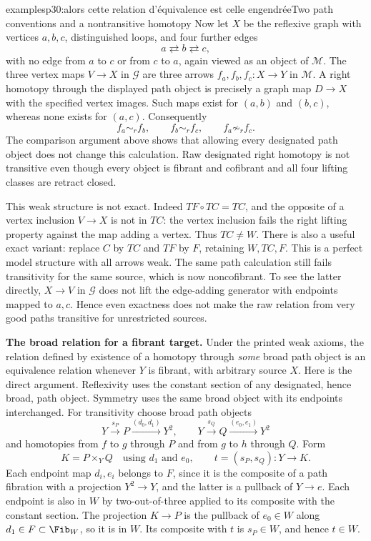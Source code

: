 \begin{dcomment}{examples}{p30:alors cette relation d'équivalence est celle engendrée}{Two path conventions and a nontransitive homotopy}
Now let $X$ be the reflexive graph with vertices $a,b,c$, distinguished loops, and four further edges
\[
 a\rightleftarrows b\rightleftarrows c,
\]
with no edge from $a$ to $c$ or from $c$ to $a$, again viewed as an object of $\mathcal M$. The three vertex maps $V\to X$ in $\mathcal G$ are three arrows $f_a,f_b,f_c:X\to Y$ in $\mathcal M$. A right homotopy through the displayed path object is precisely a graph map $D\to X$ with the specified vertex images. Such maps exist for $(a,b)$ and $(b,c)$, whereas none exists for $(a,c)$. Consequently
\[
 f_a\sim_r f_b,\qquad f_b\sim_r f_c,
 \qquad f_a\not\sim_r f_c.
\]
The comparison argument above shows that allowing every designated path object does not change this calculation. Raw designated right homotopy is not transitive even though every object is fibrant and cofibrant and all four lifting classes are retract closed.

This weak structure is not exact. Indeed $TF\circ TC=TC$, and the opposite of a vertex inclusion $V\to X$ is not in $TC$: the vertex inclusion fails the right lifting property against the map adding a vertex. Thus $TC\ne W$. There is also a useful exact variant: replace $C$ by $TC$ and $TF$ by $F$, retaining $W,TC,F$. This is a perfect model structure with all arrows weak. The same path calculation still fails transitivity for the same source, which is now noncofibrant. To see the latter directly, $X\to V$ in $\mathcal G$ does not lift the edge-adding generator with endpoints mapped to $a,c$. Hence even exactness does not make the raw relation from very good paths transitive for unrestricted sources.

\noindent\textbf{The broad relation for a fibrant target.}
Under the printed weak axioms, the relation defined by existence of a homotopy through \emph{some} broad path object is an equivalence relation whenever $Y$ is fibrant, with arbitrary source $X$. Here is the direct argument. Reflexivity uses the constant section of any designated, hence broad, path object. Symmetry uses the same broad object with its endpoints interchanged. For transitivity choose broad path objects
\[
 Y\xrightarrow{s_P}P\xrightarrow{(d_0,d_1)}Y^2,
 \qquad
 Y\xrightarrow{s_Q}Q\xrightarrow{(e_0,e_1)}Y^2
\]
and homotopies from $f$ to $g$ through $P$ and from $g$ to $h$ through $Q$. Form
\[
 K=P\mathbin{\times_{Y}}Q
 \quad\text{using }d_1\text{ and }e_0,
 \qquad
 t=(s_P,s_Q):Y\longrightarrow K.
\]
Each endpoint map $d_i,e_i$ belongs to $F$, since it is the composite of a path fibration with a projection $Y^2\to Y$, and the latter is a pullback of $Y\to e$. Each endpoint is also in $W$ by two-out-of-three applied to its composite with the constant section. The projection $K\to P$ is the pullback of $e_0\in W$ along $d_1\in F\subset\Fib_W$, so it is in $W$. Its composite with $t$ is $s_P\in W$, and hence $t\in W$.


\end{dcomment}
